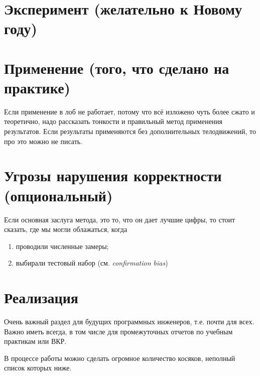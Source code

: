 \section{Эксперимент (желательно к Новому году)}


\section{Применение (того, что сделано на практике)}

Если применение в лоб не работает, потому что всё изложено чуть более сжато и теоретично, надо рассказать тонкости и правильный метод применения результатов. Если результаты применяются без дополнительных телодвижений, то про это можно не писать.

\section{Угрозы нарушения корректности (опциональный)}

Если основная заслуга метода, это то, что он дает лучшие цифры, то стоит сказать, где мы могли облажаться, когда
\begin{enumerate}
\item проводили численные замеры;
\item выбирали тестовый набор (см. \emph{confirmation bias})
\end{enumerate}

\section{Реализация}
Очень важный раздел для будущих программных инженеров, т.е. почти для всех. Важно иметь всегда, в том числе для промежуточных отчетов по учебным практикам или ВКР.

В процессе работы можно сделать огромное количество косяков, неполный список которых ниже.

